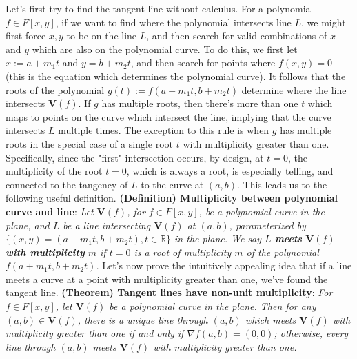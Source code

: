 \documentclass{article}
\begin{document}
Let's first try to find the tangent line without calculus. For a polynomial $ f \in F[x, y] $, if we want to find where the polynomial intersects line $ L $, we might first force $ x, y $ to be on the line $ L $, and then search for valid combinations of $ x $ and $ y $ which are also on the polynomial curve. To do this, we first let $ x := a + m_1 t $ and $ y = b + m_2 t $, and then search for points where $ f(x, y) = 0 $ (this is the equation which determines the polynomial curve). It follows that the roots of the polynomial $ g(t) := f(a + m_1 t, b + m_2 t) $ determine where the line intersects $ \mathbf{V}(f) $. If $ g $ has multiple roots, then there's more than one $ t $ which maps to points on the curve which intersect the line, implying that the curve intersects $ L $ multiple times. The exception to this rule is when $ g $ has multiple roots in the special case of a single root $ t $ with multiplicity greater than one. Specifically, since the "first" intersection occurs, by design, at $ t = 0 $, the multiplicity of the root $ t = 0 $, which is always a root, is especially telling, and connected to the tangency of $ L $ to the curve at $ (a, b) $. This leads us to the following useful definition.
\newline \newline
\textbf{(Definition) Multiplicity between polynomial curve and line}: \textit{Let $ \mathbf{V}(f) $, for $ f \in F[x, y] $, be a polynomial curve in the plane, and $ L $ be a line intersecting $ \mathbf{V}(f) $ at $ (a, b) $, parameterized by $ \{ (x, y) = (a + m_1 t, b + m_2 t), t \in \mathbb{R} \} $ in the plane. We say $ L $ \textbf{meets} $ \mathbf{V}(f) $ \textbf{with multiplicity} $ m $ if $ t = 0 $ is a root of multiplicity $ m $ of the polynomial $ f(a + m_1 t, b + m_2 t) $.}
\newline \newline
Let's now prove the intuitively appealing idea that if a line meets a curve at a point with multiplicity greater than one, we've found the tangent line.
\newline \newline
\textbf{(Theorem) Tangent lines have non-unit multiplicity}: \textit{For $ f \in F[x, y] $, let $ \mathbf{V}(f) $ be a polynomial curve in the plane. Then for any $ (a, b) \in \mathbf{V}(f) $, there is a unique line through $ (a, b) $ which meets $ \mathbf{V}(f) $ with multiplicity greater than one if and only if $ \nabla f(a, b) = (0, 0) $; otherwise, every line through $ (a, b) $ meets $ \mathbf{V}(f) $ with multiplicity greater than one.}
\end{document}
